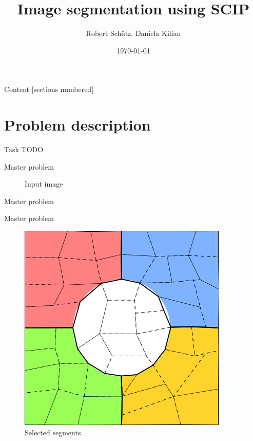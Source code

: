 \documentclass[fleqn]{beamer}
\title{Image segmentation using SCIP}
\subtitle{}
\date{\today}
\author{Robert Schütz, Daniela Kilian}
\institute{Advanced project SS 2017}
\begin{document}
	\maketitle
	
	\begin{frame}{Content}
		[sections numbered]
		\tableofcontents
	\end{frame}

	\section{Problem description}
	\begin{frame}{Task}
		TODO
	\end{frame}	
	
	\begin{frame}{Master problem}
		\begin{figure}
			\centering
				\caption{Input image}
			
		\end{figure}
	\end{frame}
	
	\begin{frame}{Master problem}
		\begin{figure}
			\centering
		\end{figure}
	\end{frame}
	
	\begin{frame}{Master problem}
		\begin{figure}
			\centering
			\includegraphics[scale=.5]{data_segments.png}
			\caption{Selected segments}
		\end{figure}
	\end{frame}
\end{document}
